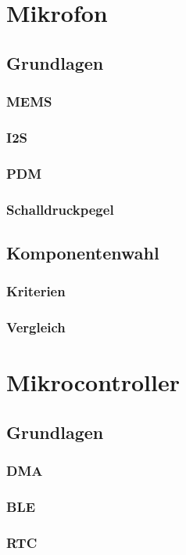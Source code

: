 \documentclass[12pt]{article}
\begin{document}
	\newpage
	\section{Mikrofon}
	\subsection{Grundlagen}
	\subsubsection{MEMS}
	\subsubsection{I2S}
	\subsubsection{PDM}
	\subsubsection{Schalldruckpegel}
	\subsection{Komponentenwahl}
	\subsubsection{Kriterien}
	\subsubsection{Vergleich}
	
	\newpage
	\section{Mikrocontroller}
	\subsection{Grundlagen}
	\subsubsection{DMA}
	\subsubsection{BLE}
	\subsubsection{RTC}
\end{document}
